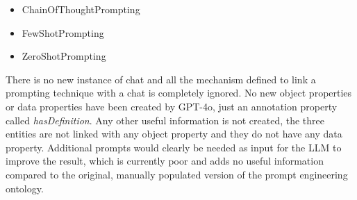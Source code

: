 \begin{itemize}
    \item ChainOfThoughtPrompting
    \item FewShotPrompting
    \item ZeroShotPrompting
\end{itemize}
There is no new instance of chat and all the mechanism defined to link a prompting technique with a chat is completely ignored. No new object properties or data properties have been created by GPT-4o, just an annotation property called \textit{hasDefinition}. Any other useful information is not created, the three entities are not linked with any object property and they do not have any data property. Additional prompts would clearly be needed as input for the LLM to improve the result, which is currently poor and adds no useful information compared to the original, manually populated version of the prompt engineering ontology.